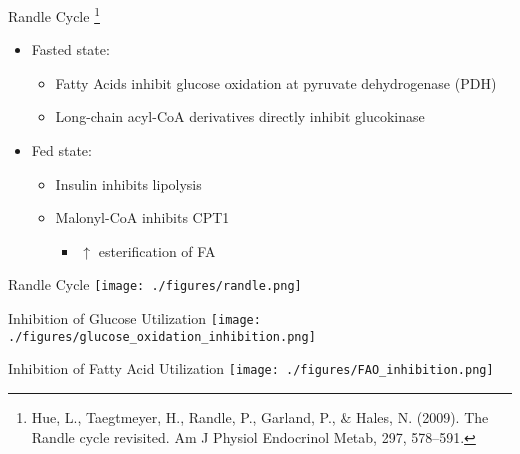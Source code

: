 \documentclass[presentation, smaller]{beamer}
\begin{document}
\begin{frame}[label={sec:orgheadline11}]{Randle Cycle \footnote{Hue, L., Taegtmeyer, H., Randle, P., Garland, P., \& Hales,
N. (2009). The Randle cycle revisited. Am J Physiol Endocrinol Metab,
297, 578–591.}}
\begin{itemize}
\item Fasted state:
\begin{itemize}
\item Fatty Acids inhibit glucose oxidation at pyruvate dehydrogenase
(PDH)
\item Long-chain acyl-CoA derivatives directly inhibit glucokinase
\end{itemize}
\item Fed state:
\begin{itemize}
\item Insulin inhibits lipolysis
\item Malonyl-CoA inhibits CPT1
\begin{itemize}
\item \(\uparrow\) esterification of FA
\end{itemize}
\end{itemize}
\end{itemize}
\end{frame}

\begin{frame}[label={sec:orgheadline12}]{Randle Cycle}
\texttt{[image: ./figures/randle.png]}
\end{frame}

\begin{frame}[label={sec:orgheadline13}]{Inhibition of Glucose Utilization}
\texttt{[image: ./figures/glucose\_oxidation\_inhibition.png]}
\end{frame}

\begin{frame}[label={sec:orgheadline14}]{Inhibition of Fatty Acid Utilization}
\texttt{[image: ./figures/FAO\_inhibition.png]}
\end{frame}
\end{document}
